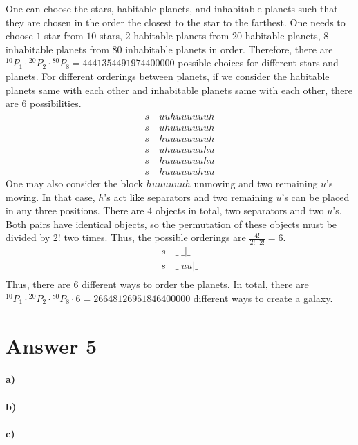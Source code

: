 \documentclass[12pt]{article}
\newcommand{\+}{\mkern2mu}
\newcommand*{\myPerm}[2]{{}^{#1}\!P_{#2}}%
\begin{document}
One can choose the stars, habitable planets, and inhabitable planets such that they are chosen in the order the closest to the star to the farthest. One needs to choose $1$ star from $10$ stars, $2$ habitable planets from $20$ habitable planets, $8$ inhabitable planets from $80$ inhabitable planets in order. Therefore, there are $\myPerm{10}{1} \cdot \myPerm{20}{2} \cdot \myPerm{80}{8} = \num[group-separator={,}]{4441354491974400000}$ possible choices for different stars and planets. For different orderings between planets, if we consider the habitable planets same with each other and inhabitable planets same with each other, there are $6$ possibilities.
\begin{gather*}
    s \quad uuhuuuuuuh \\
    s \quad uhuuuuuuuh \\
    s \quad huuuuuuuuh \\
    s \quad uhuuuuuuhu \\
    s \quad huuuuuuuhu \\
    s \quad huuuuuuhuu
\end{gather*}
One may also consider the block $huuuuuuh$ unmoving and two remaining $u$'s moving. In that case, $h$'s act like separators and two remaining $u$'s can be placed in any three positions. There are $4$ objects in total, two separators and two $u$'s. Both pairs have identical objects, so the permutation of these objects must be divided by $2!$ two times. Thus, the possible orderings are $\tfrac{4!}{2! \cdot 2!} = 6$.
\begin{gather*}
    s \quad \_|\_|\_ \\
    s \quad \_|uu|\_ \\
\end{gather*}
Thus, there are $6$ different ways to order the planets. In total, there are $\myPerm{10}{1} \cdot \myPerm{20}{2} \cdot \myPerm{80}{8} \cdot 6 = \num[group-separator={,}]{26648126951846400000}$ different ways to create a galaxy.

\section*{Answer 5}
\paragraph{a)}
\paragraph{b)}
\paragraph{c)}
\end{document}
